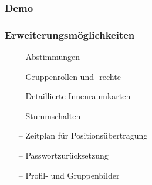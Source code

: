\documentclass[aspectratio=1610]{beamer}
\begin{document}

  \begin{frame}[plain]
      \frametitle{\textbf{Demo}}

  \end{frame}

  \begin{frame}[plain]
      \frametitle{\textbf{Erweiterungsmöglichkeiten}}
        \begin{itemize}
          \item[--] Abstimmungen
          \item[--] Gruppenrollen und -rechte
          \item[--] Detaillierte Innenraumkarten
          \item[--] Stummschalten
          \item[--] Zeitplan für Positionsübertragung
          \item[--] Passwortzurücksetzung
          \item[--] Profil- und Gruppenbilder
        \end{itemize}
  \end{frame}
\end{document}
